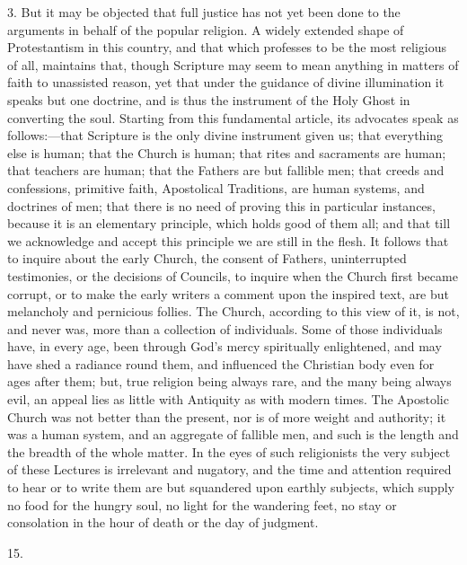 3. But it may be objected that full justice has not yet been done
to the arguments in behalf of the popular religion. A widely extended
shape of Protestantism in this country, and that which professes to be
the most religious of all, maintains that, though Scripture may seem
to mean anything in matters of faith to unassisted reason, yet that
under the guidance of divine illumination it speaks but one
doctrine, and is thus the instrument of the Holy Ghost in converting
the soul. Starting from this fundamental article, its advocates speak
as follows:—that Scripture is the only divine instrument given us;
that everything else is human; that the Church is human; that rites
and sacraments are human; that teachers are human; that the Fathers
are but fallible men; that creeds and confessions, primitive faith,
Apostolical Traditions, are human systems, and doctrines of men; that
there is no need of proving this in particular instances, because it
is an elementary principle, which holds good of them all; and that
till we acknowledge and accept this principle we are still in the
flesh. It follows that to inquire about the early Church, the consent
of Fathers, uninterrupted testimonies, or the decisions of Councils,
to inquire when the Church first became corrupt, or to make the early
writers a comment upon the inspired text, are but melancholy and
pernicious follies. The Church, according to this view of it, is not,
and never was, more than a collection of individuals. Some of those
individuals have, in every age, been through God's mercy spiritually
enlightened, and may have shed a radiance round them, and influenced
the Christian body even for ages after them; but, true religion being
always rare, and the many being always evil, an appeal lies as little
with Antiquity as with modern times. The Apostolic Church was not
better than the present, nor is of more weight and authority; it was a
human system, and an aggregate of fallible men, and such is the length
and the breadth of the whole matter. In the eyes of such religionists
the very subject of these Lectures is irrelevant and nugatory, and the
time and attention required to hear or to write them are but
squandered upon earthly subjects, which supply no food for the hungry
soul, no light for the wandering feet, no stay or consolation in the
hour of death or the day of judgment.

15.

